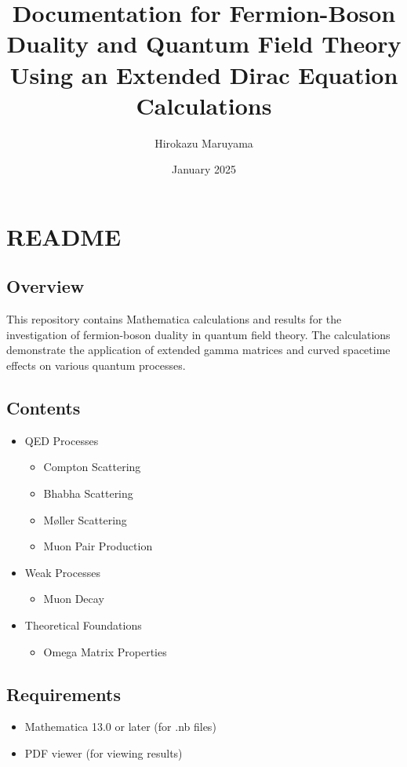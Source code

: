 \documentclass[12pt]{article}
\title{Documentation for Fermion-Boson Duality and Quantum Field Theory Using an Extended Dirac Equation Calculations}
\author{Hirokazu Maruyama}
\date{January 2025}
\begin{document}
\maketitle

\section*{README}
\subsection*{Overview}
This repository contains Mathematica calculations and results for the investigation of fermion-boson duality in quantum field theory. The calculations demonstrate the application of extended gamma matrices and curved spacetime effects on various quantum processes.

\subsection*{Contents}
\begin{itemize}
\item QED Processes
  \begin{itemize}
  \item Compton Scattering
  \item Bhabha Scattering
  \item Møller Scattering
  \item Muon Pair Production
  \end{itemize}
\item Weak Processes
  \begin{itemize}
  \item Muon Decay
  \end{itemize}
\item Theoretical Foundations
  \begin{itemize}
  \item Omega Matrix Properties
  \end{itemize}
\end{itemize}

\subsection*{Requirements}
\begin{itemize}
\item Mathematica 13.0 or later (for .nb files)
\item PDF viewer (for viewing results)
\end{itemize}
\end{document}
